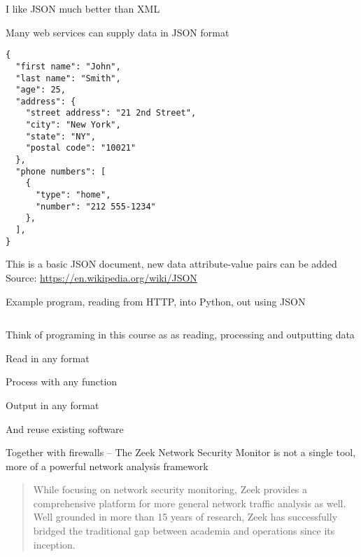 \documentclass[Screen16to9,17pt]{foils}
\begin{document}
\begin{list2}
\item I like JSON much better than XML
\item Many web services can supply data in JSON format
\end{list2}


\begin{verbatim}
{
  "first name": "John",
  "last name": "Smith",
  "age": 25,
  "address": {
    "street address": "21 2nd Street",
    "city": "New York",
    "state": "NY",
    "postal code": "10021"
  },
  "phone numbers": [
    {
      "type": "home",
      "number": "212 555-1234"
    },
  ],
}
\end{verbatim}

\begin{list2}
\item This is a basic JSON document, new data attribute-value pairs can be added\\
Source: \url{https://en.wikipedia.org/wiki/JSON}
\end{list2}





Example program, reading from HTTP, into Python, out using JSON
\inputminted{python}{programs/rest-1.py}

\begin{list2}
\item Think of programing in this course as as reading, processing and outputting data
\item Read in any format
\item Process with any function
\item Output in any format
\item And reuse existing software
\end{list2}




Together with firewalls -- The Zeek Network Security Monitor is not a single tool, more of a powerful network analysis framework


\begin{quote}
While focusing on network security monitoring, Zeek provides a comprehensive platform for more general network traffic analysis as well. Well grounded in more than 15 years of research, Zeek has successfully bridged the traditional gap between academia and operations since its inception.
\end{quote}
\end{document}
